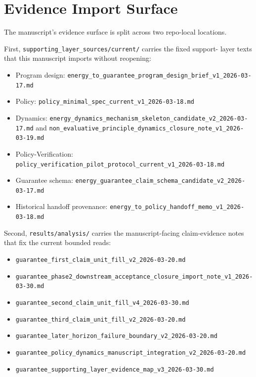 \documentclass[11pt]{article}
\begin{document}
\section{Evidence Import Surface}

The manuscript's evidence surface is split across two repo-local locations.

First, \texttt{supporting\_layer\_sources/current/} carries the fixed support-
layer texts that this manuscript imports without reopening:
\begin{itemize}
\item Program design:
  \texttt{energy\_to\_guarantee\_program\_design\_brief\_v1\_2026-03-17.md}
\item Policy:
  \texttt{policy\_minimal\_spec\_current\_v1\_2026-03-18.md}
\item Dynamics:
  \texttt{energy\_dynamics\_mechanism\_skeleton\_candidate\_v2\_2026-03-17.md}
  and
  \texttt{non\_evaluative\_principle\_dynamics\_closure\_note\_v1\_2026-03-19.md}
\item Policy-Verification:
  \texttt{policy\_verification\_pilot\_protocol\_current\_v1\_2026-03-18.md}
\item Guarantee schema:
  \texttt{energy\_guarantee\_claim\_schema\_candidate\_v2\_2026-03-17.md}
\item Historical handoff provenance:
  \texttt{energy\_to\_policy\_handoff\_memo\_v1\_2026-03-18.md}
\end{itemize}

Second, \texttt{results/analysis/} carries the manuscript-facing claim-evidence
notes that fix the current bounded reads:
\begin{itemize}
\item \texttt{guarantee\_first\_claim\_unit\_fill\_v2\_2026-03-20.md}
\item \texttt{guarantee\_phase2\_downstream\_acceptance\_closure\_import\_note\_v1\_2026-03-30.md}
\item \texttt{guarantee\_second\_claim\_unit\_fill\_v4\_2026-03-30.md}
\item \texttt{guarantee\_third\_claim\_unit\_fill\_v2\_2026-03-20.md}
\item \texttt{guarantee\_later\_horizon\_failure\_boundary\_v2\_2026-03-20.md}
\item \texttt{guarantee\_policy\_dynamics\_manuscript\_integration\_v2\_2026-03-20.md}
\item \texttt{guarantee\_supporting\_layer\_evidence\_map\_v3\_2026-03-30.md}
\end{itemize}
\end{document}
